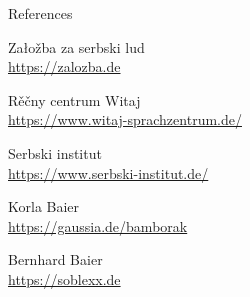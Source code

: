  \begin{block}{References}


    \begin{multicols}{2} %
        \raggedbottom %
        \begin{thebibliography}{99} 
            Załožba za serbski lud\\
            \url{https://zalozba.de}
            \vspace{1mm}
            
            Rěčny centrum Witaj\\
            \url{https://www.witaj-sprachzentrum.de/}
            \vspace{1mm}

            \columnbreak
            
            Serbski institut\\
            \url{https://www.serbski-institut.de/}
            \vspace{1mm}
            
            Korla Baier\\
            \url{https://gaussia.de/bamborak}
            \vspace{1mm}
            
            Bernhard Baier\\
            \url{https://soblexx.de}
            \vspace{1mm}
            
        \end{thebibliography}
    \end{multicols}
\end{block}    


